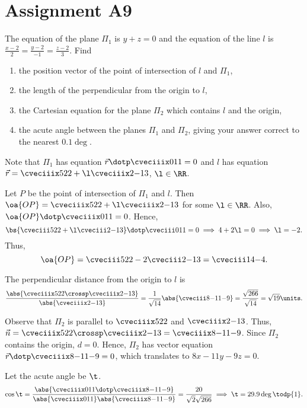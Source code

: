 \section{Assignment A9}

\begin{problem}
    The equation of the plane $\Pi_1$ is $y + z = 0$ and the equation of the line $l$ is $\frac{x-2}2 = \frac{y-2}{-1} = \frac{z-2}3$. Find
    \begin{enumerate}
        \item the position vector of the point of intersection of $l$ and $\Pi_1$,
        \item the length of the perpendicular from the origin to $l$,
        \item the Cartesian equation for the plane $\Pi_2$ which contains $l$ and the origin,
        \item the acute angle between the planes $\Pi_1$ and $\Pi_2$, giving your answer correct to the nearest $0.1 \deg$.
    \end{enumerate}
\end{problem}
\begin{solution}
    Note that $\Pi_1$ has equation $\vec r \dotp \cveciiix011 = 0$ and $l$ has equation $\vec r = \cveciiix522 + \l \cveciiix2{-1}3$, $\l \in \RR$.

    \begin{ppart}
        Let $P$ be the point of intersection of $\Pi_1$ and $l$. Then $\oa{OP} = \cveciiix522 + \l \cveciiix2{-1}3$ for some $\l \in \RR$. Also, $\oa{OP} \dotp \cveciiix011 = 0$. Hence, \[\bs{\cveciii522 + \l \cveciii2{-1}3} \dotp \cveciii011 = 0 \implies 4 + 2\l = 0 \implies \l = -2.\] Thus, \[\oa{OP} = \cveciii522 - 2\cveciii2{-1}3 = \cveciii14{-4}.\]
    \end{ppart}
    \begin{ppart}
        The perpendicular distance from the origin to $l$ is \[\frac{\abs{\cveciiix522 \crossp \cveciiix2{-1}3}}{\abs{\cveciiix2{-1}3}} = \frac1{\sqrt{14}} \abs{\cveciii8{-11}{-9}} = \frac{\sqrt{266}}{\sqrt{14}} = \sqrt{19} \units.\]
    \end{ppart}
    \begin{ppart}
        Observe that $\Pi_2$ is parallel to $\cveciiix522$ and $\cveciiix2{-1}3$. Thus, $\vec n = \cveciiix522 \crossp \cveciiix2{-1}3 = \cveciiix8{-11}{-9}$. Since $\Pi_2$ contains the origin, $d = 0$. Hence, $\Pi_2$ has vector equation $\vec r \dotp \cveciiix8{-11}{-9} = 0$, which translates to $8x - 11y - 9z = 0$.
    \end{ppart}
    \begin{ppart}
        Let the acute angle be $\t$. \[\cos\t = \frac{\abs{\cveciiix011 \dotp \cveciiix8{-11}{-9}}}{\abs{\cveciiix011}\abs{\cveciiix8{-11}{-9}}} = \frac{20}{\sqrt{2}\sqrt{266}} \implies \t = 29.9\deg \todp{1}.\]
    \end{ppart}
\end{solution}

